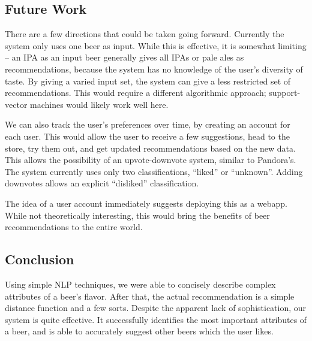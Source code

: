 \documentclass[11pt]{article}
\begin{document}
\subsection*{Future Work}
There are a few directions that could be taken going forward. Currently the system only uses one beer as input. While this is effective, it is somewhat limiting -- an IPA as an input beer generally gives all IPAs or pale ales as recommendations, because the system has no knowledge of the user's diversity of taste. By giving a varied input set, the system can give a less restricted set of recommendations. This would require a different algorithmic approach; support-vector machines would likely work well here.

We can also track the user's preferences over time, by creating an account for each user. This would allow the user to receive a few suggestions, head to the store, try them out, and get updated recommendations based on the new data. This allows the possibility of an upvote-downvote system, similar to Pandora's. The system currently uses only two classifications, ``liked'' or ``unknown''. Adding downvotes allows an explicit ``disliked'' classification.

The idea of a user account immediately suggests deploying this as a webapp. While not theoretically interesting, this would bring the benefits of beer recommendations to the entire world.

\subsection*{Conclusion}
Using simple NLP techniques, we were able to concisely describe complex attributes of a beer's flavor. After that, the actual recommendation is a simple distance function and a few sorts. Despite the apparent lack of sophistication, our system is quite effective. It successfully identifies the most important attributes of a beer, and is able to accurately suggest other beers which the user likes.
\end{document}
